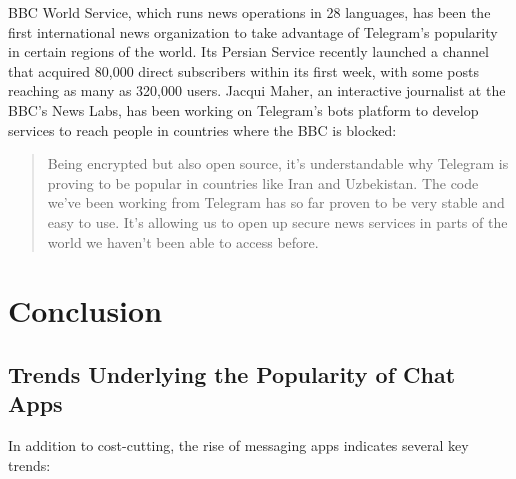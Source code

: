 \documentclass[notoc, symmetric, nobib, nols]{towcenter-guideto-book}
\newcommand{\blankpage}{\newpage\hbox{}\thispagestyle{empty}\newpage}
\begin{document}
BBC World Service, which runs news operations in 28 languages, has been the first international news organization to take advantage of Telegram's popularity in certain regions of the world. Its Persian Service recently launched a channel that acquired 80,000 direct subscribers within its first week, with some posts reaching as many as 320,000 users. Jacqui Maher, an interactive journalist at the BBC's News Labs, has been working on Telegram's bots platform to develop services to reach people in countries where the BBC is blocked: 

\begin{quote}
Being encrypted but also open source, it's understandable why Telegram is proving to be popular in countries like Iran and Uzbekistan. The code we've been working from Telegram has so far proven to be very stable and easy to use. It's allowing us to open up secure news services in parts of the world we haven't been able to access before.
\end{quote}




\chapter{Conclusion}
\blankpage

\section{Trends Underlying the Popularity of Chat Apps}

In addition to cost-cutting, the rise of messaging apps indicates several key trends:
\end{document}
